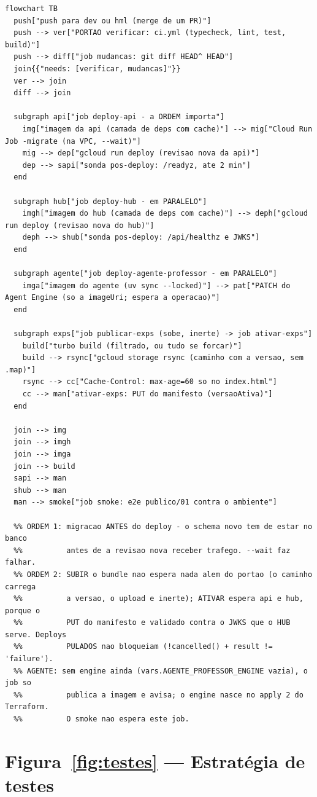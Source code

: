 \begin{lstlisting}[language=mermaid]
flowchart TB
  push["push para dev ou hml (merge de um PR)"]
  push --> ver["PORTAO verificar: ci.yml (typecheck, lint, test, build)"]
  push --> diff["job mudancas: git diff HEAD^ HEAD"]
  join{{"needs: [verificar, mudancas]"}}
  ver --> join
  diff --> join

  subgraph api["job deploy-api - a ORDEM importa"]
    img["imagem da api (camada de deps com cache)"] --> mig["Cloud Run Job -migrate (na VPC, --wait)"]
    mig --> dep["gcloud run deploy (revisao nova da api)"]
    dep --> sapi["sonda pos-deploy: /readyz, ate 2 min"]
  end

  subgraph hub["job deploy-hub - em PARALELO"]
    imgh["imagem do hub (camada de deps com cache)"] --> deph["gcloud run deploy (revisao nova do hub)"]
    deph --> shub["sonda pos-deploy: /api/healthz e JWKS"]
  end

  subgraph agente["job deploy-agente-professor - em PARALELO"]
    imga["imagem do agente (uv sync --locked)"] --> pat["PATCH do Agent Engine (so a imageUri; espera a operacao)"]
  end

  subgraph exps["job publicar-exps (sobe, inerte) -> job ativar-exps"]
    build["turbo build (filtrado, ou tudo se forcar)"]
    build --> rsync["gcloud storage rsync (caminho com a versao, sem .map)"]
    rsync --> cc["Cache-Control: max-age=60 so no index.html"]
    cc --> man["ativar-exps: PUT do manifesto (versaoAtiva)"]
  end

  join --> img
  join --> imgh
  join --> imga
  join --> build
  sapi --> man
  shub --> man
  man --> smoke["job smoke: e2e publico/01 contra o ambiente"]

  %% ORDEM 1: migracao ANTES do deploy - o schema novo tem de estar no banco
  %%          antes de a revisao nova receber trafego. --wait faz falhar.
  %% ORDEM 2: SUBIR o bundle nao espera nada alem do portao (o caminho carrega
  %%          a versao, o upload e inerte); ATIVAR espera api e hub, porque o
  %%          PUT do manifesto e validado contra o JWKS que o HUB serve. Deploys
  %%          PULADOS nao bloqueiam (!cancelled() + result != 'failure').
  %% AGENTE: sem engine ainda (vars.AGENTE_PROFESSOR_ENGINE vazia), o job so
  %%          publica a imagem e avisa; o engine nasce no apply 2 do Terraform.
  %%          O smoke nao espera este job.
\end{lstlisting}

\section{Figura~\ref{fig:testes} --- Estratégia de testes}

